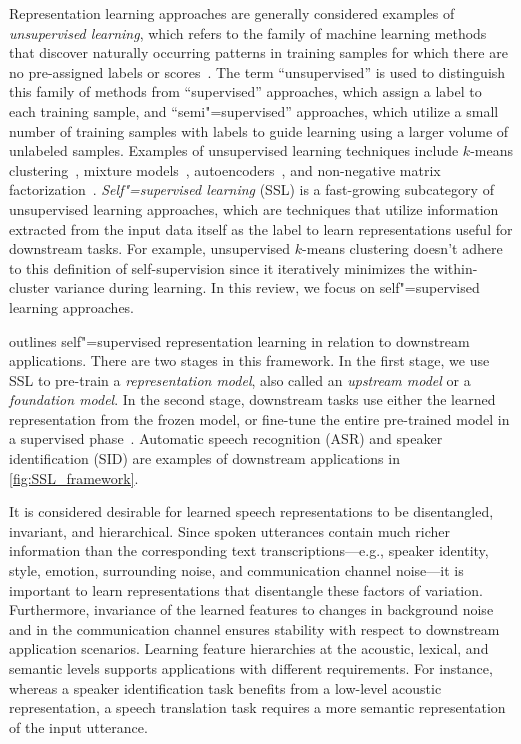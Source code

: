 Representation learning approaches are generally considered examples of \textit{unsupervised
learning}, which refers to the family of machine learning methods that discover
naturally occurring patterns in training samples for which there are no pre-assigned
labels or scores~\parencite{jordan_machine_2015}. 
The term ``unsupervised'' is used to distinguish this family of methods from
``supervised'' approaches, which assign a label to each training sample, and
``semi"=supervised'' approaches, which utilize a small number of training samples
with labels to guide learning using a larger volume of unlabeled samples.
Examples of unsupervised learning techniques include $k$-means clustering~\parencite{gray_vector_1984}, mixture models~\parencite{jordan_hierarchical_1994}, autoencoders~\parencite{hinton_autoencoders_1994},
and non-negative matrix factorization~\parencite{lee_learning_1999}. 
\textit{Self"=supervised learning} (SSL) is a fast-growing subcategory of
unsupervised learning approaches, which are techniques that utilize
information extracted from the input data itself as the label to learn
representations useful for 
downstream tasks. {\color{black} For example, unsupervised $k$-means clustering doesn't adhere to this definition of self-supervision since it iteratively minimizes the within-cluster variance during learning.}
In this review, we
focus on self"=supervised learning approaches.

 outlines self"=supervised representation learning in
relation to downstream applications. 
There are two stages in this framework.
In the first stage, we use SSL to pre-train a \textit{representation model},
also called an \textit{upstream model} or a \textit{foundation model}.
In the second stage, downstream tasks use either the learned
representation from the frozen model, or fine-tune the entire pre-trained model
in a supervised phase~\parencite{hinton_reducing_2006}. 
Automatic speech recognition (ASR) and speaker identification (SID) are 
examples of downstream applications in \cref{fig:SSL_framework}.

It is considered desirable for learned speech representations to be
disentangled, invariant, and hierarchical.
Since spoken utterances contain much richer information than the corresponding text
transcriptions---e.g., speaker identity, style, emotion, surrounding noise, and
communication channel noise---it is important to learn representations that
disentangle these factors of variation. Furthermore, invariance of the learned
features to changes in background noise and in the communication channel ensures
stability with respect to downstream application scenarios. Learning feature
hierarchies at the acoustic, lexical, and semantic levels supports applications
with different requirements. For instance, whereas a speaker identification task
benefits from a low-level acoustic representation, a speech
translation task requires a more semantic representation of the input
utterance. 

